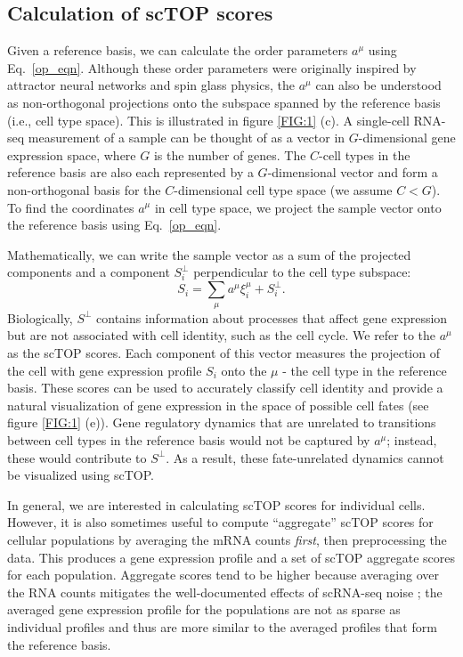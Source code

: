 \documentclass[vruler,JEB]{COB}%
\def\be{\begin{equation}}
\def\ee{\end{equation}}
\begin{document}
\subsection{Calculation of scTOP scores}

Given a reference basis, we can calculate the order parameters $a^\mu$ using Eq.~\ref{op_eqn}. Although these order parameters were originally inspired by attractor neural networks and spin glass physics, the $a^{\mu}$ can also be understood as non-orthogonal projections onto the subspace spanned by the reference basis (i.e., cell type space). This is illustrated in figure \ref{FIG:1} (c). A single-cell RNA-seq measurement of a sample can be thought of as a vector in $G$-dimensional gene expression space, where $G$ is the number of genes. The $C$-cell types in the reference basis are also each represented by a $G$-dimensional vector and form a non-orthogonal basis for the $C$-dimensional cell type space (we assume $C < G$). To find the coordinates $a^\mu$ in cell type space, we project the sample vector onto the reference basis using Eq.~\ref{op_eqn}.

Mathematically, we can write the sample vector as a sum of the projected components and a component $S^{\perp}_i$  perpendicular to the cell type subspace: 
\be
S_i = \sum_\mu a^{\mu} \xi^{\mu}_i + S^{\perp}_i.
\ee
Biologically, $S^{\perp}$ contains information about processes that affect gene expression but are not associated with cell identity, such as the cell cycle. We refer to the $a^{\mu}$ as the scTOP scores. Each component of this vector measures the projection of the cell with gene expression profile $S_i$ onto the $\mu$ - the cell type in the reference basis. These scores can be used to accurately classify cell identity and provide a natural visualization of gene expression in the space of possible cell fates (see figure \ref{FIG:1} (e)). Gene regulatory dynamics that are unrelated to transitions between cell types in the reference basis would not be captured by $a^{\mu}$; instead, these would contribute to $S^{\perp}$. As a result, these fate-unrelated dynamics cannot be visualized using scTOP.

In general, we are interested in calculating scTOP scores for individual cells. However, it is also sometimes useful to compute ``aggregate'' scTOP scores for cellular populations by averaging the mRNA counts \textit{first}, then preprocessing the data. This produces a gene expression profile and a set of scTOP aggregate scores for each population. Aggregate scores tend to be higher because averaging over the RNA counts mitigates the well-documented effects of scRNA-seq noise \citep{hicks2018missing, lahnemann_eleven_2020}; the averaged gene expression profile for the populations are not as sparse as individual profiles and thus are more similar to the averaged profiles that form the reference basis.
\end{document}
